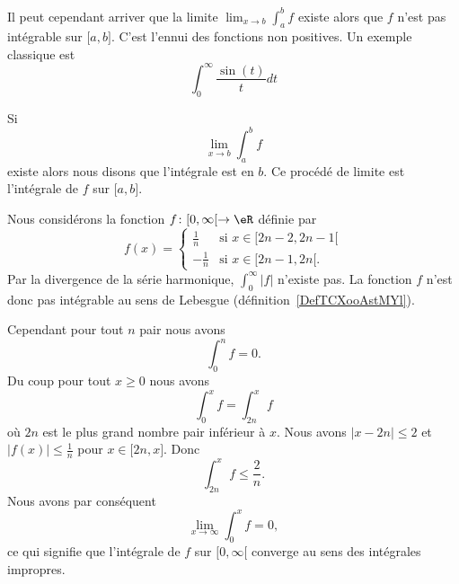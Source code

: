 Il peut cependant arriver que la limite \( \lim_{x\to b} \int_a^bf\) existe alors que \( f\) n'est pas intégrable sur \( \mathopen[ a , b \mathclose]\). C'est l'ennui des fonctions non positives. Un exemple classique est
\begin{equation}\label{EqMMVooDSpgfz}
    \int_0^{\infty}\frac{ \sin(t) }{ t }dt
\end{equation}

\begin{definition}      \label{DEFooINPOooWWObEz}
    Si
    \begin{equation}
        \lim_{x\to b} \int_a^bf
    \end{equation}
    existe alors nous disons que l'intégrale est  en \( b\). Ce procédé de limite est l'intégrale  de \( f\) sur \( \mathopen[ a , b \mathclose]\).
\end{definition}

\begin{example}
    Nous considérons la fonction \( f\colon \mathopen[ 0 , \infty [\to \eR\) définie par
    \begin{equation}
        f(x)=\begin{cases}
            \frac{1}{ n }    &   \text{si } x\in\mathopen[ 2n-2 , 2n-1 [\\
                -\frac{1}{ n }    &    \text{si } x\in\mathopen[ 2n-1 , 2n [\text{.}
        \end{cases}
    \end{equation}
    Par la divergence de la série harmonique, \( \int_{0}^{\infty}| f |\) n'existe pas. La fonction \( f\) n'est donc pas intégrable au sens de Lebesgue (définition~\ref{DefTCXooAstMYl}).

    Cependant pour tout \( n\) pair nous avons
    \begin{equation}
        \int_0^nf=0.
    \end{equation}
    Du coup pour tout \( x\geq 0\) nous avons
    \begin{equation}
        \int_0^xf=\int_{2n}^xf
    \end{equation}
    où \( 2n\) est le plus grand nombre pair inférieur à \( x\). Nous avons \( | x-2n |\leq 2\) et \( | f(x) |\leq \frac{1}{ n }\) pour \( x\in\mathopen[ 2n , x \mathclose]\). Donc
    \begin{equation}
        \int_{2n}^xf\leq \frac{ 2 }{ n }.
    \end{equation}
    Nous avons par conséquent
    \begin{equation}
        \lim_{x\to \infty} \int_0^xf=0,
    \end{equation}
    ce qui signifie que l'intégrale de \( f\) sur \( \mathopen[ 0 , \infty [\) converge au sens des intégrales impropres.
\end{example}


